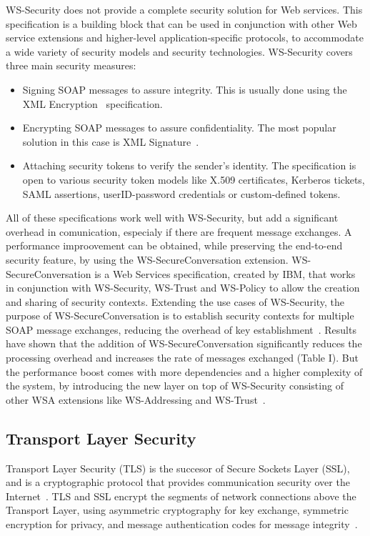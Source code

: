 WS-Security does not provide a complete security solution for Web services. This specification is a building block that can be used in conjunction with other Web service extensions and higher-level application-specific protocols, to accommodate a wide variety of security models and security technologies. WS-Security covers three main security measures:
\begin{itemize}
 \item Signing SOAP messages to assure integrity. This is usually done using the XML Encryption~\cite{w3c-ws-enc} specification.
 \item Encrypting SOAP messages to assure confidentiality. The most popular solution in this case is XML Signature~\cite{w3c-ws-sign}.
 \item Attaching security tokens to verify the sender's identity. The specification is open to various security token models like X.509 certificates, Kerberos tickets, SAML assertions, userID-password credentials or custom-defined tokens.
\end{itemize}

All of these specifications work well with WS-Security, but add a significant overhead in comunication, especialy if there are frequent message exchanges. A performance improovement can be obtained, while preserving the end-to-end security feature, by using the WS-SecureConversation extension. WS-SecureConversation is a Web Services specification, created by IBM, that works in conjunction with WS-Security, WS-Trust and WS-Policy to allow the creation and sharing of security contexts. Extending the use cases of WS-Security, the purpose of WS-SecureConversation is to establish security contexts for multiple SOAP message exchanges, reducing the overhead of key establishment~\cite{ibm-ws-sec-conv}. Results have shown that the addition of WS-SecureConversation significantly reduces the processing overhead and increases the rate of messages exchanged (Table I). But the performance boost comes with more dependencies and a higher complexity of the system, by introducing the new layer on top of WS-Security consisting of other WSA extensions like WS-Addressing and WS-Trust~\cite{wiki-ws-sec-conv}.

\subsection{Transport Layer Security}
\label{subsec:ws-sec-ext}

Transport Layer Security (TLS) is the succesor of Secure Sockets Layer (SSL), and is a cryptographic protocol that provides communication security over the Internet~\cite{rfc-tls}. TLS and SSL encrypt the segments of network connections above the Transport Layer, using asymmetric cryptography for key exchange, symmetric encryption for privacy, and message authentication codes for message integrity~\cite{wiki-tls}.

